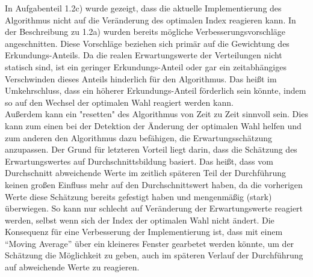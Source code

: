 \documentclass[11pt]{article}
\begin{document}
In Aufgabenteil 1.2c) wurde gezeigt, dass die aktuelle Implementierung des Algorithmus nicht auf die Veränderung des optimalen Index reagieren kann. In der Beschreibung zu 1.2a) wurden bereits mögliche Verbesserungsvorschläge angeschnitten. Diese Vorschläge beziehen sich primär auf die Gewichtung des Erkundungs-Anteils. Da die realen Erwartungswerte der Verteilungen nicht statisch sind, ist ein geringer Erkundungs-Anteil oder gar ein zeitabhängiges Verschwinden dieses Anteils hinderlich für den Algorithmus. Das heißt im Umkehrschluss, dass ein höherer Erkundungs-Anteil förderlich sein könnte, indem so auf den Wechsel der optimalen Wahl reagiert werden kann.\\
Außerdem kann ein "resetten" des Algorithmus von Zeit zu Zeit sinnvoll sein. Dies kann zum einen bei der Detektion der Änderung der optimalen Wahl helfen und zum anderen den Algorithmus dazu befähigen, die Erwartungsschätzung anzupassen. Der Grund für letzteren Vorteil liegt darin, dass die Schätzung des Erwartungswertes auf Durchschnittsbildung basiert. Das heißt, dass vom Durchschnitt abweichende Werte im zeitlich späteren Teil der Durchführung keinen großen Einfluss mehr auf den Durchschnittswert haben, da die vorherigen Werte diese Schätzung bereits gefestigt haben und mengenmäßig (stark) überwiegen. So kann nur schlecht auf Veränderung der Erwartungswerte reagiert werden, selbst wenn sich der Index der optimalen Wahl nicht ändert. Die Konsequenz für eine Verbesserung der Implementierung ist, dass mit einem ``Moving Average'' über ein kleineres Fenster gearbetet werden könnte, um der Schätzung die Möglichkeit zu geben, auch im späteren Verlauf der Durchführung auf abweichende Werte zu reagieren.

\end{document}
